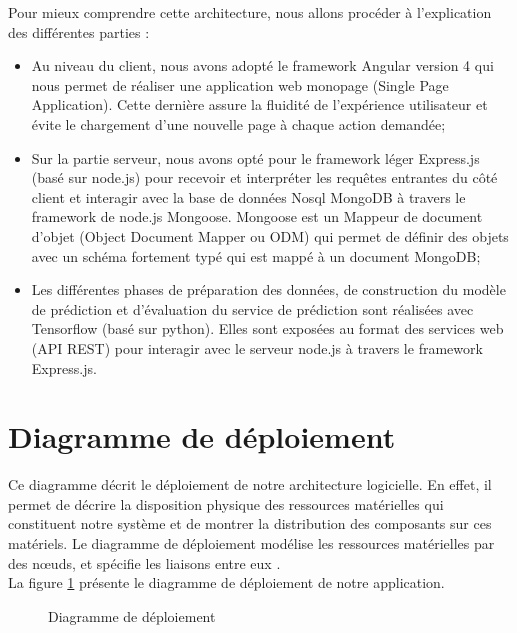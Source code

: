 Pour mieux comprendre cette architecture, nous allons procéder à l'explication des différentes parties :
 \begin{itemize}
    \item Au niveau du client, nous avons adopté le framework Angular version 4 qui nous permet de réaliser une application web monopage (Single Page Application). Cette dernière assure la fluidité de l'expérience utilisateur et évite le chargement d'une nouvelle page à chaque action demandée;
    
    \item Sur la partie serveur, nous avons opté pour le framework léger Express.js (basé sur node.js) pour recevoir et interpréter les requêtes entrantes du côté client et interagir avec la base de données Nosql MongoDB à travers le framework de node.js Mongoose.
    Mongoose est un Mappeur de document d'objet (Object Document Mapper ou ODM) qui permet de définir des objets avec un schéma fortement typé qui est mappé à un document MongoDB;
    
      \item  Les différentes phases de préparation des données, de construction du modèle de prédiction et d'évaluation du service de prédiction sont réalisées avec Tensorflow (basé sur python). Elles sont exposées au format des services web (API REST) pour interagir avec le serveur node.js à travers le framework Express.js. 
   
   
    \end{itemize}

\section{Diagramme de déploiement}
Ce diagramme décrit le déploiement de notre architecture logicielle.
En effet, il permet de décrire la disposition physique des ressources matérielles qui constituent notre système et de montrer la distribution des composants sur ces matériels. Le diagramme de déploiement modélise les ressources matérielles par des nœuds, et spécifie les liaisons entre eux \cite{DiagrammeDeploiement}.\\
La figure \ref{fig:Diagramme de déploiement} présente le diagramme de déploiement de notre application.
      \begin{figure}[htpb]
\centering
{}
\caption{Diagramme de déploiement}
\label{fig:Diagramme de déploiement}
\end{figure}

